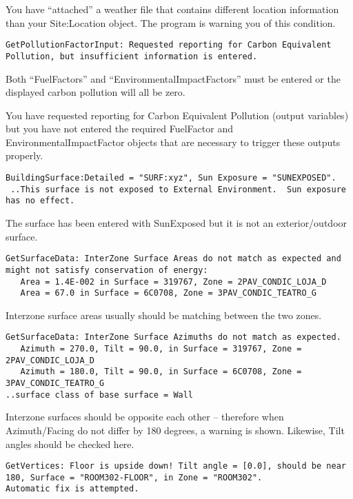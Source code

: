 You have ``attached'' a weather file that contains different location information than your Site:Location object. The program is warning you of this condition.

\begin{lstlisting}
GetPollutionFactorInput: Requested reporting for Carbon Equivalent Pollution, but insufficient information is entered.
\end{lstlisting}

Both ``FuelFactors'' and ``EnvironmentalImpactFactors'' must be entered or the displayed carbon pollution will all be zero.

You have requested reporting for Carbon Equivalent Pollution (output variables) but you have not entered the required FuelFactor and EnvironmentalImpactFactor objects that are necessary to trigger these outputs properly.

\begin{lstlisting}
BuildingSurface:Detailed = "SURF:xyz", Sun Exposure = "SUNEXPOSED".
 ..This surface is not exposed to External Environment.  Sun exposure has no effect.
\end{lstlisting}

The surface has been entered with SunExposed but it is not an exterior/outdoor surface.

\begin{lstlisting}
GetSurfaceData: InterZone Surface Areas do not match as expected and might not satisfy conservation of energy:
   Area = 1.4E-002 in Surface = 319767, Zone = 2PAV_CONDIC_LOJA_D
   Area = 67.0 in Surface = 6C0708, Zone = 3PAV_CONDIC_TEATRO_G
\end{lstlisting}

Interzone surface areas usually should be matching between the two zones.

\begin{lstlisting}
GetSurfaceData: InterZone Surface Azimuths do not match as expected.
   Azimuth = 270.0, Tilt = 90.0, in Surface = 319767, Zone = 2PAV_CONDIC_LOJA_D
   Azimuth = 180.0, Tilt = 90.0, in Surface = 6C0708, Zone = 3PAV_CONDIC_TEATRO_G
..surface class of base surface = Wall
\end{lstlisting}

Interzone surfaces should be opposite each other -- therefore when Azimuth/Facing do not differ by 180 degrees, a warning is shown. Likewise, Tilt angles should be checked here.

\begin{lstlisting}
GetVertices: Floor is upside down! Tilt angle = [0.0], should be near 180, Surface = "ROOM302-FLOOR", in Zone = "ROOM302".
Automatic fix is attempted.
\end{lstlisting}

